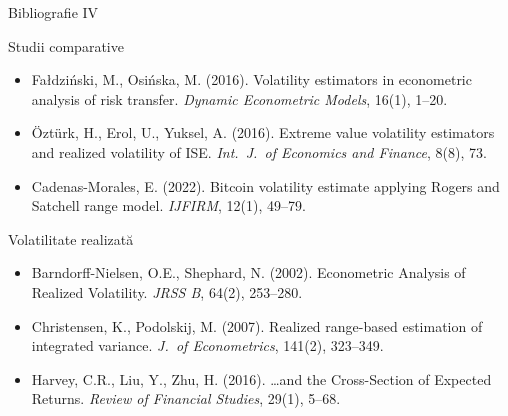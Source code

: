 \documentclass[9pt, aspectratio=169, t]{beamer}
\theoremstyle{definition}
\newenvironment{cminipage}[1]{%
    \par\noindent\hfill\begin{minipage}{#1}\ignorespaces
}{%
    \end{minipage}\hfill\null\par
}
\begin{document}
\begin{frame}{Bibliografie IV}
    \vspace{-0.3cm}
    \begin{cminipage}{0.95\textwidth}
    \begin{block}{Studii comparative}
        {\small
        \begin{itemize}\setlength{\itemsep}{0pt}
            \item Fa{\l}dzi\'{n}ski, M., Osi\'{n}ska, M. (2016). Volatility estimators in econometric analysis of risk transfer. \textit{Dynamic Econometric Models}, 16(1), 1--20.
            \item \"{O}zt\"{u}rk, H., Erol, U., Yuksel, A. (2016). Extreme value volatility estimators and realized volatility of ISE. \textit{Int.\ J.\ of Economics and Finance}, 8(8), 73.
            \item Cadenas-Morales, E. (2022). Bitcoin volatility estimate applying Rogers and Satchell range model. \textit{IJFIRM}, 12(1), 49--79.
        \end{itemize}
        }
    \end{block}

    \begin{exampleblock}{Volatilitate realizată}
        {\small
        \begin{itemize}\setlength{\itemsep}{0pt}
            \item Barndorff-Nielsen, O.E., Shephard, N. (2002). Econometric Analysis of Realized Volatility. \textit{JRSS B}, 64(2), 253--280.
            \item Christensen, K., Podolskij, M. (2007). Realized range-based estimation of integrated variance. \textit{J.\ of Econometrics}, 141(2), 323--349.
            \item Harvey, C.R., Liu, Y., Zhu, H. (2016). \ldots and the Cross-Section of Expected Returns. \textit{Review of Financial Studies}, 29(1), 5--68.
        \end{itemize}
        }
    \end{exampleblock}
    \end{cminipage}
\end{frame}
\end{document}
